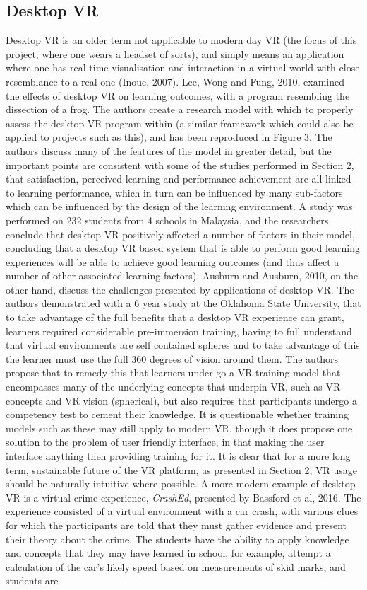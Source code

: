 \documentclass[11pt]{report}
\begin{document}
\subsection{Desktop VR}
Desktop VR is an older term not applicable to modern day VR (the focus of this project, where one wears a headset of sorts), and simply means an application where one has real time visualisation and interaction in a virtual world with close resemblance to a real one (Inoue, 2007). Lee, Wong and Fung, 2010, examined the effects of desktop VR on learning outcomes, with a program resembling the dissection of a frog. The authors create a research model with which to properly assess the desktop VR program within (a similar framework which could also be applied to projects such as this), and has been reproduced in Figure 3. The authors discuss many of the features of the model in greater detail, but the important points are consistent with some of the studies performed in Section 2, that satisfaction, perceived learning and performance achievement are all linked to learning performance, which in turn can be influenced by many sub-factors which can be influenced by the design of the learning environment. A study was performed on 232 students from 4 schools in Malaysia, and the researchers conclude that desktop VR positively affected a number of factors in their model, concluding that a desktop VR based system that is able to perform good learning experiences will be able to achieve good learning outcomes (and thus affect a number of other associated learning factors). Ausburn and Ausburn, 2010, on the other hand, discuss the challenges presented by applications of desktop VR. The authors demonstrated with a 6 year study at the Oklahoma State University, that to take advantage of the full benefits that a desktop VR experience can grant, learners required considerable pre-immersion training, having to full understand that virtual environments are self contained spheres and to take advantage of this the learner must use the full 360 degrees of vision around them. The authors propose that to remedy this that learners under go a VR training model that encompasses many of the underlying concepts that underpin VR, such as VR concepts and VR vision (spherical), but also requires that participants undergo a competency test to cement their knowledge. It is questionable whether training models such as these may still apply to modern VR, though it does propose one solution to the problem of user friendly interface, in that making the user interface anything then providing training for it. It is clear that for a more long term, sustainable future of the VR platform, as presented in Section 2, VR usage should be naturally intuitive where possible. A more modern example of desktop VR is a virtual crime experience, \textit{CrashEd}, presented by Bassford et al, 2016. The experience consisted of a virtual environment with a car crash, with various clues for which the participants are told that they must gather evidence and present their theory about the crime. The students have the ability to apply knowledge and concepts that they may have learned in school, for example, attempt a calculation of the car's likely speed based on measurements of skid marks, and students are 
\end{document}
